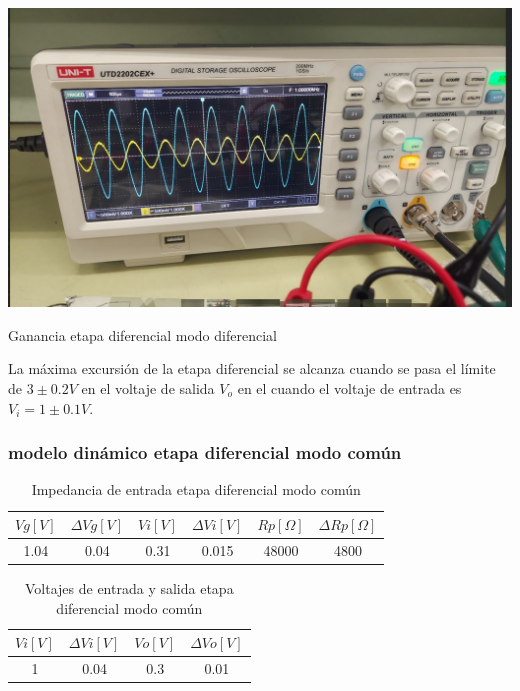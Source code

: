 \begin{ilustracion}[ht]
    \centering
    \includegraphics[width=1.0\textwidth]{src/images/resultados/p2/med-ganancia-mod-diff.png}
    \caption{Ganancia etapa diferencial modo diferencial}
    \label{ilus:ganancia-etapa-diff-mod-diff}
    
\end{ilustracion}

La máxima excursión de la etapa diferencial se alcanza cuando se pasa el límite de $3 \pm 0.2 V$ en el voltaje de salida $V_o$ en el cuando el voltaje de entrada es $V_i = 1 \pm 0.1 V$.



\subsubsection{modelo dinámico etapa diferencial modo común}

\begin{table}[h!]
\centering
\begin{tabular}{|c|c|c|c|c|c|}
\hline
\textbf{\(Vg[V]\)} & \textbf{\(\varDelta Vg[V]\)} & \textbf{\(Vi[V]\)} & \textbf{\(\varDelta Vi[V]\)} & \textbf{\(Rp[\Omega]\)} & \textbf{\(\varDelta Rp[\Omega]\)} \\ \hline
1.04 & 0.04 & 0.31 & 0.015 & 48000 & 4800 \\ \hline
\end{tabular}
\caption{Impedancia de entrada etapa diferencial modo común}
\label{tab:med-impedancia-entrada-etapa-diferencial-modo-comun}
\end{table}

\begin{table}[h!] \centering \begin{tabular}{|c|c|c|c|} \hline \textbf{\(Vi[V]\)} & \textbf{\(\varDelta Vi[V]\)} & \textbf{\(Vo[V]\)} & \textbf{\(\varDelta Vo[V]\)} \\ \hline 1 & 0.04 & 0.3 & 0.01 \\ \hline \end{tabular} \caption{Voltajes de entrada y salida etapa diferencial modo común} \label{tab:med-voltajes-entrada-salida-etapa-diferencial-modo-comun} \end{table}


